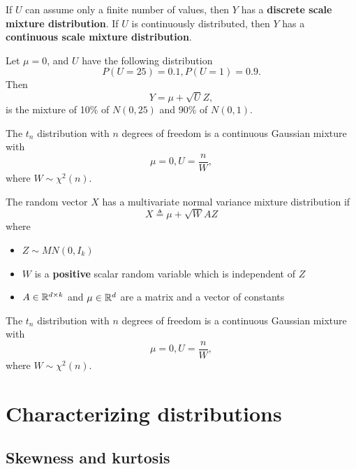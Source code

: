 \begin{refsection}
\begin{definition}
If $U$ can assume only a finite number of values, then $Y$ has a \textbf{discrete scale mixture distribution}. If $U$ is continuously distributed, then $Y$ has a \textbf{continuous scale mixture distribution}.
\end{definition}


\begin{example}
Let $\mu = 0$, and $U$ have the following distribution
$$P(U=25) = 0.1, P(U=1) = 0.9.$$
Then  $$Y = \mu + \sqrt{U}Z,$$
is the mixture of 10\% of $N(0,25)$ and 90\% of $N(0,1)$.
\end{example}

\begin{example}[t distribution]
The $t_n$ distribution with $n$ degrees of freedom is a continuous Gaussian mixture with 
$$\mu = 0, U = \frac{n}{W},$$
where $W\sim \chi^2(n)$.
\end{example}

\begin{definition}
The random vector $X$ has a multivariate normal variance mixture distribution if
$$X\triangleq \mu + \sqrt{W}AZ$$
where
\begin{itemize}
	\item $Z\sim MN(0,I_k)$
	\item $W$ is a \textbf{positive} scalar random variable which is independent of $Z$
	\item $A\in \mathbb{R}^{d\times k}$ and $\mu \in \mathbb{R}^d$ are a matrix and a vector of constants 
\end{itemize}
\end{definition}

\begin{remark}
	
\end{remark}


\begin{example}
	The $t_n$ distribution with $n$ degrees of freedom is a continuous Gaussian mixture with 
	$$\mu = 0, U = \frac{n}{W},$$
	where $W\sim \chi^2(n)$.
\end{example}


\section{Characterizing distributions}
\subsection{Skewness and kurtosis}


\end{refsection}
